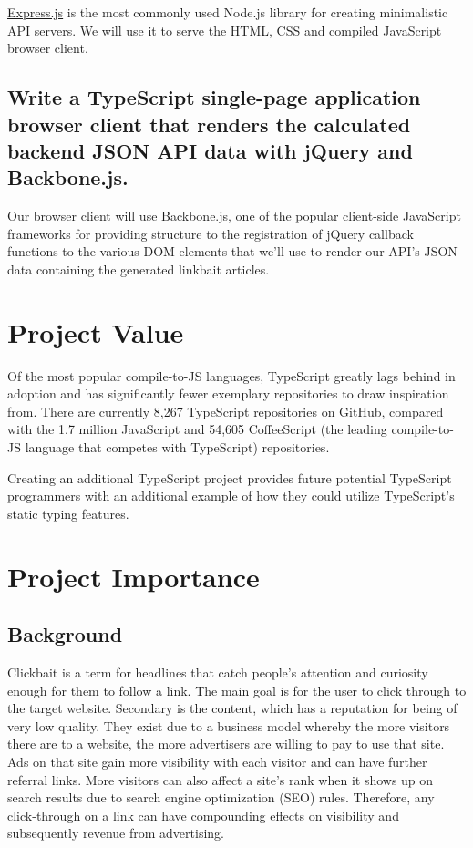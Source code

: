 \documentclass[]{article}
\begin{document}
\href{http://expressjs.com/}{Express.js} is the most commonly used
Node.js library for creating minimalistic API servers. We will use it to
serve the HTML, CSS and compiled JavaScript browser client.

\subsection{Write a TypeScript single-page application browser client
that renders the calculated backend JSON API data with jQuery and
Backbone.js.}\label{write-a-typescript-single-page-application-browser-client-that-renders-the-calculated-backend-json-api-data-with-jquery-and-backbone.js.}

Our browser client will use \href{http://backbonejs.org/}{Backbone.js},
one of the popular client-side JavaScript frameworks for providing
structure to the registration of jQuery callback functions to the
various DOM elements that we'll use to render our API's JSON data
containing the generated linkbait articles.

\section{Project Value}\label{project-value}

Of the most popular compile-to-JS languages, TypeScript greatly lags
behind in adoption and has significantly fewer exemplary repositories to
draw inspiration from. There are currently 8,267 TypeScript repositories
on GitHub, compared with the 1.7 million JavaScript and 54,605
CoffeeScript (the leading compile-to-JS language that competes with
TypeScript) repositories.

Creating an additional TypeScript project provides future potential
TypeScript programmers with an additional example of how they could
utilize TypeScript's static typing features.

\section{Project Importance}\label{project-importance}

\subsection{Background}\label{background}

Clickbait is a term for headlines that catch people's attention and
curiosity enough for them to follow a link. The main goal is for the
user to click through to the target website. Secondary is the content,
which has a reputation for being of very low quality. They exist due to
a business model whereby the more visitors there are to a website, the
more advertisers are willing to pay to use that site. Ads on that site
gain more visibility with each visitor and can have further referral
links. More visitors can also affect a site's rank when it shows up on
search results due to search engine optimization (SEO) rules. Therefore,
any click-through on a link can have compounding effects on visibility
and subsequently revenue from advertising.
\end{document}
